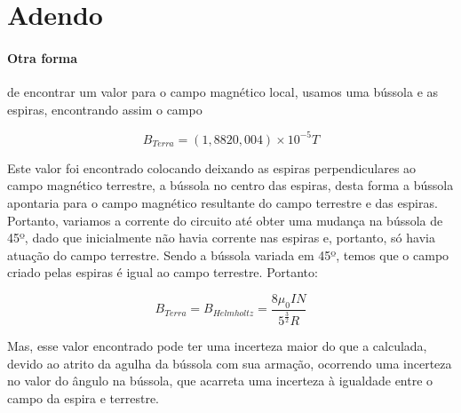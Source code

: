 \section{Adendo}
    \paragraph{Otra forma} de encontrar um valor para o campo magnético local, 
    usamos uma bússola e as espiras, encontrando assim o campo

    $$B_{Terra} = (1,8820,004)\times 10^{-5}T$$
    
    Este valor foi encontrado colocando deixando as espiras perpendiculares
     ao campo magnético terrestre, a bússola no centro das espiras, 
     desta forma a bússola apontaria para o campo magnético resultante do 
     campo terrestre e das espiras. Portanto, variamos a corrente do 
     circuito até obter uma mudança na bússola de 45º, dado que 
     inicialmente não havia corrente nas espiras e, portanto, só havia 
     atuação do campo terrestre. Sendo a bússola variada em 45º, temos 
     que o campo criado pelas espiras é igual ao campo terrestre. Portanto:
    
    $$B_{Terra} = B_{Helmholtz} = \frac{8 \mu_0 I N}{5^{\frac{3}{2}} R}$$
    
    Mas, esse valor encontrado pode ter uma incerteza maior do 
    que a calculada, devido ao atrito da agulha da bússola com sua 
    armação, ocorrendo uma incerteza no valor do ângulo na bússola, 
    que acarreta uma incerteza à igualdade entre o campo da espira e terrestre.
